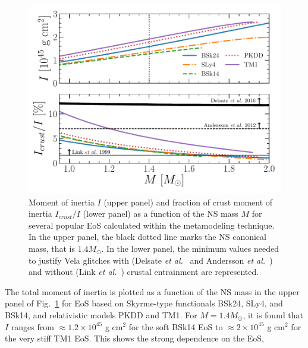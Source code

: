 \begin{figure}[!t]
\begin{center}
  \includegraphics[width=0.9\linewidth]{figures/moi_popular.pdf}
\end{center}
\caption[Moment of inertia and fraction of crust moment of inertia
versus neutron star mass for several popular equations of state]{Moment of
  inertia $I$ (upper panel) and fraction of crust moment of inertia
  $I_{crust}/I$ (lower panel) as a function of the NS mass $M$ for several 
  popular EoS calculated within the metamodeling technique. In the upper panel, 
  the black dotted line marks the NS canonical mass, that is $1.4M_\odot$. In
the lower panel, the minimum values needed to justify Vela glitches with
(Delsate \textit{et al.}~\cite{Delsate2016} and Andersson \textit{et
al.}~\cite{Andersson2012}) and without (Link \textit{et al.}~\cite{Link1999}) 
crustal entrainment are represented.}\label{fig:moi_popular}
\end{figure}

The total moment of inertia is plotted as a function of the NS mass in the
upper panel of Fig.~\ref{fig:moi_popular} for EoS based on Skyrme-type
functionals BSk24, SLy4, and BSk14, and relativistic models PKDD and TM1.
For $M=1.4M_\odot$, it is found that $I$ ranges from $\approx 1.2\times 
10^{45}$ g cm$^2$ for the soft BSk14 EoS to $\approx 2\times 10^{45}$ g cm$^2$ 
for the very stiff TM1 EoS. This shows the strong dependence on the EoS, 

